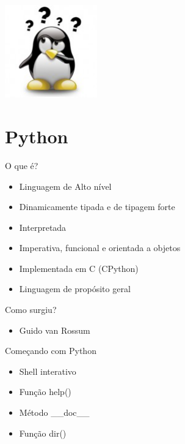 \documentclass{beamer}
\begin{document}
\begin{frame}
\begin{center}
   \includegraphics[width=0.3\textwidth]{images/tux.jpg}
\end{center}
\end{frame}


\section{Python}

\begin{frame}{O que \'e?}
 \begin{itemize}
  \item Linguagem de Alto n\'ivel
  \item Dinamicamente tipada e de tipagem forte
  \item Interpretada
  \item Imperativa, funcional e orientada a objetos
  \item Implementada em C (CPython)
  \item Linguagem de prop\'osito geral
 \end{itemize}

\end{frame}

\begin{frame}{Como surgiu?}
 \begin{itemize}
  \item Guido van Rossum
   
 \end{itemize}

\end{frame}

\begin{frame}{Come\c{c}ando com Python}
 \begin{itemize}
  \item Shell interativo
  \item Fun\c{c}\~ao help()
  \item M\'etodo \_\_doc\_\_
  \item Fun\c{c}\~ao dir()
 \end{itemize}

\end{frame}
\end{document}
